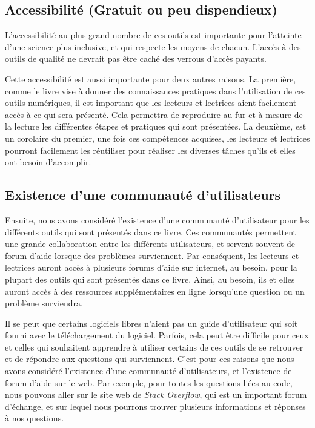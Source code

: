 \documentclass[
  letterpaper,
  DIV=11,
  numbers=noendperiod]{scrreprt}
\begin{document}
\subsection{Accessibilité (Gratuit ou peu
dispendieux)}\label{accessibilituxe9-gratuit-ou-peu-dispendieux}

L'accessibilité au plus grand nombre de ces outils est importante pour
l'atteinte d'une science plus inclusive, et qui respecte les moyens de
chacun. L'accès à des outils de qualité ne devrait pas être caché des
verrous d'accès payants.

Cette accessibilité est aussi importante pour deux autres raisons. La
première, comme le livre vise à donner des connaissances pratiques dans
l'utilisation de ces outils numériques, il est important que les
lecteurs et lectrices aient facilement accès à ce qui sera présenté.
Cela permettra de reproduire au fur et à mesure de la lecture les
différentes étapes et pratiques qui sont présentées. La deuxième, est un
corolaire du premier, une fois ces compétences acquises, les lecteurs et
lectrices pourront facilement les réutiliser pour réaliser les diverses
tâches qu'ils et elles ont besoin d'accomplir.

\subsection{Existence d'une communauté
d'utilisateurs}\label{existence-dune-communautuxe9-dutilisateurs}

Ensuite, nous avons considéré l'existence d'une communauté d'utilisateur
pour les différents outils qui sont présentés dans ce livre. Ces
communautés permettent une grande collaboration entre les différents
utilisateurs, et servent souvent de forum d'aide lorsque des problèmes
surviennent. Par conséquent, les lecteurs et lectrices auront accès à
plusieurs forums d'aide sur internet, au besoin, pour la plupart des
outils qui sont présentés dans ce livre. Ainsi, au besoin, ils et elles
auront accès à des ressources supplémentaires en ligne lorsqu'une
question ou un problème surviendra.

Il se peut que certains logiciels libres n'aient pas un guide
d'utilisateur qui soit fourni avec le téléchargement du logiciel.
Parfois, cela peut être difficile pour ceux et celles qui souhaitent
apprendre à utiliser certains de ces outils de se retrouver et de
répondre aux questions qui surviennent. C'est pour ces raisons que nous
avons considéré l'existence d'une communauté d'utilisateurs, et
l'existence de forum d'aide sur le web. Par exemple, pour toutes les
questions liées au code, nous pouvons aller sur le site web de
\emph{Stack Overflow}, qui est un important forum d'échange, et sur
lequel nous pourrons trouver plusieurs informations et réponses à nos
questions.
\end{document}

